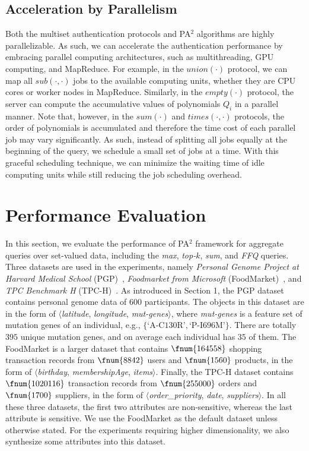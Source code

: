 \subsection{Acceleration by Parallelism}
Both the multiset authentication protocols and PA$^2$ algorithms are highly parallelizable. As such, we can accelerate the authentication performance by embracing parallel computing architectures, such as multithreading, GPU computing, and MapReduce. For example, in the $union(\cdot)$ protocol, we can map all $sub(\cdot, \cdot)$ jobs to the available computing units, whether they are CPU cores or worker nodes in MapReduce. Similarly, in the $empty(\cdot)$ protocol, the server can compute the accumulative values of polynomials $Q_i$ in a parallel manner. Note that, however, in the $sum(\cdot)$ and $times(\cdot, \cdot)$ protocols, the order of polynomials is accumulated and therefore the time cost of each parallel job may vary significantly. As such, instead of splitting all jobs equally at the beginning of the query, we schedule a small set of jobs at a time. With this graceful scheduling technique, we can minimize the waiting time of idle computing units while still reducing the job scheduling overhead.

\section{Performance Evaluation}\label{sec:aggregate-queries:exp}

In this section, we evaluate the performance of PA$^2$ framework for aggregate queries over set-valued data, including the \emph{max}, \emph{top-$k$}, \emph{sum}, and \emph{FFQ} queries. Three datasets are used in the experiments, namely \emph{Personal Genome Project at Harvard Medical School} (PGP)~\cite{pgp}, \emph{Foodmarket from Microsoft} (FoodMarket)~\cite{foodmarket}, and \emph{TPC Benchmark H} (TPC-H)~\cite{tpch}. As introduced in Section 1, the PGP dataset contains personal genome data of $600$ participants. The objects in this dataset are in the form of $\langle$\emph{latitude}, \emph{longitude}, \emph{mut-genes}$\rangle$, where \emph{mut-genes} is a feature set of mutation genes of an individual, e.g., $\{\text{`A-C130R'}, \text{`P-I696M'}\}$. There are totally $395$ unique mutation genes, and on average each individual has $35$ of them. The FoodMarket is a larger dataset that contains $\fnum{164558}$ shopping transaction records from $\fnum{8842}$ users and $\fnum{1560}$ products, in the form of $\langle$\emph{birthday}, \emph{membershipAge}, \emph{items}$\rangle$. Finally, the TPC-H dataset contains $\fnum{1020116}$ transaction records from $\fnum{255000}$ orders and $\fnum{1700}$ suppliers, in the form of $\langle$\emph{order\_priority}, \emph{date}, \emph{suppliers}$\rangle$. In all these three datasets, the first two attributes are non-sensitive, whereas the last attribute is sensitive. We use the FoodMarket as the default dataset unless otherwise stated. For the experiments requiring higher dimensionality, we also synthesize some attributes into this dataset.

